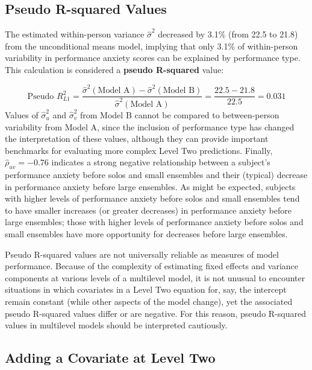 \documentclass[
]{krantz}
\begin{document}
\subsection{Pseudo R-squared Values}\label{pseudoR2}

The estimated within-person variance \(\hat{\sigma}^2\) decreased by 3.1\% (from 22.5 to 21.8) from the unconditional means model, implying that only 3.1\% of within-person variability in performance anxiety scores can be explained by performance type. This calculation is considered a \textbf{pseudo R-squared}  value:

\begin{equation*}
\textrm{Pseudo }R^2_{L1} = \frac{\hat{\sigma}^{2}(\textrm{Model A})-\hat{\sigma}^{2}(\textrm{Model B})}{\hat{\sigma}^{2}(\textrm{Model A})} = \frac{22.5-21.8}{22.5} = 0.031
\end{equation*}
Values of \(\hat{\sigma}_{u}^{2}\) and \(\hat{\sigma}_{v}^{2}\) from Model B cannot be compared to between-person variability from Model A, since the inclusion of performance type has changed the interpretation of these values, although they can provide important benchmarks for evaluating more complex Level Two predictions. Finally, \(\hat{\rho}_{uv}=-0.76\) indicates a strong negative relationship between a subject's performance anxiety before solos and small ensembles and their (typical) decrease in performance anxiety before large ensembles. As might be expected, subjects with higher levels of performance anxiety before solos and small ensembles tend to have smaller increases (or greater decreases) in performance anxiety before large ensembles; those with higher levels of performance anxiety before solos and small ensembles have more opportunity for decreases before large ensembles.

Pseudo R-squared values are not universally reliable as measures of model performance. Because of the complexity of estimating fixed effects and variance components at various levels of a multilevel model, it is not unusual to encounter situations in which covariates in a Level Two equation for, say, the intercept remain constant (while other aspects of the model change), yet the associated pseudo R-squared values differ or are negative. For this reason, pseudo R-squared values in multilevel models should be interpreted cautiously.

\subsection{Adding a Covariate at Level Two}\label{modelc}
\end{document}

